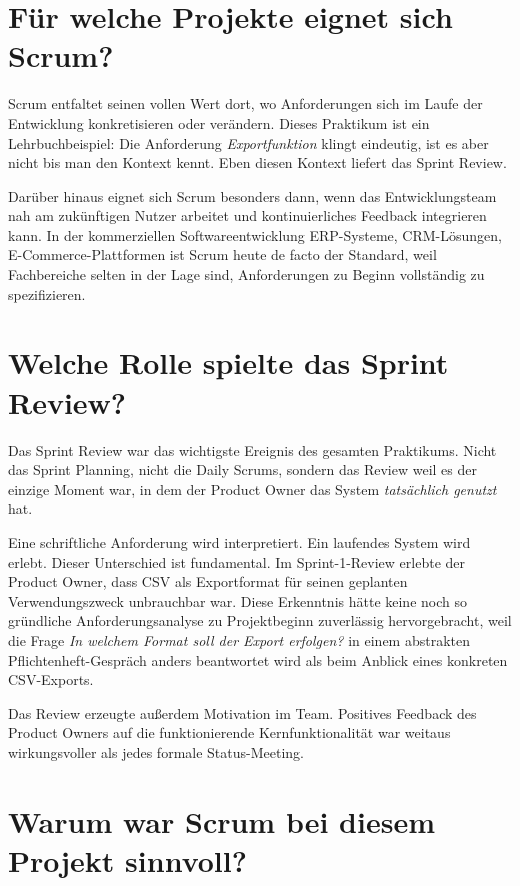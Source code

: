 \documentclass[12pt, a4paper, twoside]{report}
\begin{document}
{\section{Für welche Projekte eignet sich Scrum?}

Scrum entfaltet seinen vollen Wert dort, wo Anforderungen sich im Laufe der Entwicklung
konkretisieren oder verändern. Dieses Praktikum ist ein Lehrbuchbeispiel: Die Anforderung
\textit{Exportfunktion} klingt eindeutig, ist es aber nicht \textendash{} bis man den Kontext kennt.
Eben diesen Kontext liefert das Sprint Review.

Darüber hinaus eignet sich Scrum besonders dann, wenn das Entwicklungsteam nah am
zukünftigen Nutzer arbeitet und kontinuierliches Feedback integrieren kann. In der
kommerziellen Softwareentwicklung \textendash{} ERP-Systeme, CRM-Lösungen,
E-Commerce-Plattformen \textendash{} ist Scrum heute de facto der Standard, weil
Fachbereiche selten in der Lage sind, Anforderungen zu Beginn vollständig zu spezifizieren.

\section{Welche Rolle spielte das Sprint Review?}

Das Sprint Review war das wichtigste Ereignis des gesamten Praktikums. Nicht das
Sprint Planning, nicht die Daily Scrums, sondern das Review \textendash{} weil es der einzige
Moment war, in dem der Product Owner das System \textit{tatsächlich genutzt} hat.

Eine schriftliche Anforderung wird interpretiert. Ein laufendes System wird erlebt.
Dieser Unterschied ist fundamental. Im Sprint-1-Review erlebte der Product Owner, dass
CSV als Exportformat für seinen geplanten Verwendungszweck unbrauchbar war. Diese
Erkenntnis hätte keine noch so gründliche Anforderungsanalyse zu Projektbeginn zuverlässig
hervorgebracht, weil die Frage \textit{In welchem Format soll der Export erfolgen?}
in einem abstrakten Pflichtenheft-Gespräch anders beantwortet wird als beim Anblick
eines konkreten CSV-Exports.

Das Review erzeugte außerdem Motivation im Team. Positives Feedback des Product Owners
auf die funktionierende Kernfunktionalität war weitaus wirkungsvoller als jedes
formale Status-Meeting.

\section{Warum war Scrum bei diesem Projekt sinnvoll?}

}
\end{document}
